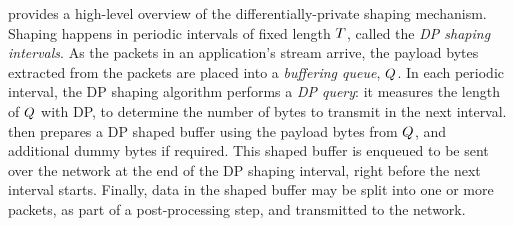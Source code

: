 %


 provides a high-level overview of the
differentially-private shaping mechanism. Shaping happens in periodic intervals
of fixed length $T$, called the {\em DP shaping intervals}.
 As the packets in an application's stream arrive, the payload bytes
extracted from the packets are placed into a {\em buffering queue}, $Q$.
 In each periodic interval, the DP shaping algorithm
performs a {\em DP query}: it measures the length of $Q$ with DP,
to determine the number of bytes to transmit in the next interval.
{\sys} then prepares a DP shaped buffer using the
payload bytes from $Q$, and additional dummy bytes if required.
This shaped buffer is enqueued to be sent over the network at the end of
the DP shaping interval, right before the next interval starts.
 Finally, data in the shaped buffer may be split into one or more
packets, as part of a post-processing step, and transmitted to the network.

